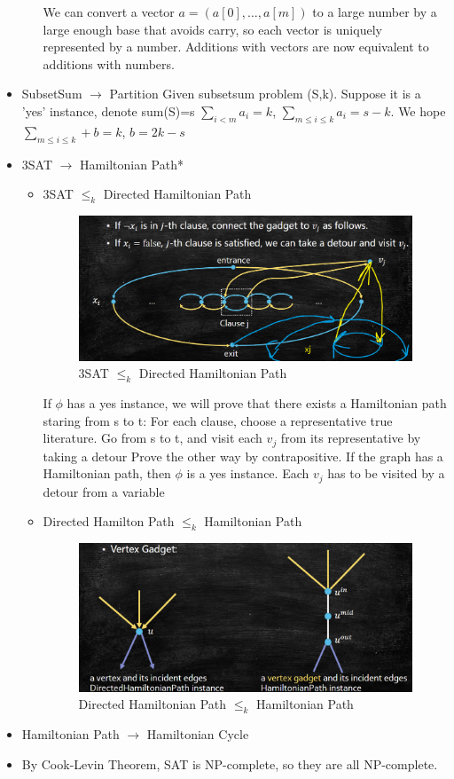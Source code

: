 \begin{itemize}
\begin{itemize}
    We can convert a vector $a=(a[0],\ldots, a[m])$ to a large number by a large enough base that avoids carry, so each vector is uniquely represented by a number. Additions with vectors are now equivalent to additions with numbers.
\end{itemize}
\item SubsetSum $\rightarrow$ Partition
Given subsetsum problem (S,k). Suppose it is a 'yes' instance, denote sum(S)=s $\sum_{i<m} a_i=k$, $\sum_{m\leq i\leq k} a_i=s-k$. We hope $\sum_{m\leq i\leq k} + b =k$, $b=2k-s$
\item 3SAT $\rightarrow$ Hamiltonian Path*
    \begin{itemize}
    \item 3SAT $\leq _k$ Directed Hamiltonian Path
    \begin{figure}
        \centering
        \includegraphics[width=0.6\linewidth]{Notes/fig/sat_dhp.png}
        \caption{3SAT $\leq _k$ Directed Hamiltonian Path}
        \label{fig:3SAT}
    \end{figure}
    If $\phi$ has a yes instance, we will prove that there exists a Hamiltonian path staring from s to t: For each clause, choose a representative true literature.
    Go from s to t, and visit each $v_j$ from its representative by
    taking a detour
    Prove the other way by contrapositive. If the graph has a Hamiltonian path, then $\phi$ is a yes instance. Each $v_j$ has to be visited by a detour from a variable
    \item Directed Hamilton Path $\leq _k$ Hamiltonian Path
    \begin{figure}
        \centering
        \includegraphics[width=0.6\linewidth]{Notes/fig/dhp_hp.png}
        \caption{Directed Hamiltonian Path $\leq _k$ Hamiltonian Path}
        \label{fig:dhp_hp}
    \end{figure}
\end{itemize}
\item Hamiltonian Path $\rightarrow$ Hamiltonian Cycle
\item By Cook-Levin Theorem, SAT is NP-complete, so they are all NP-complete.


\end{itemize}
